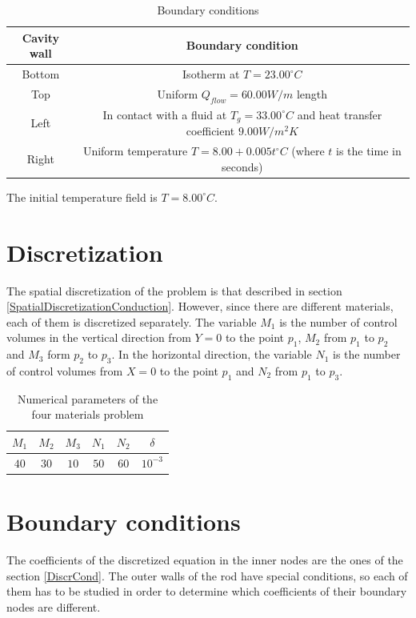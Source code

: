 \begin{table}
	\centering
	\begin{tabular}{ |c|c|}
		\hline
		Cavity wall & Boundary condition \\ \hline
		Bottom & Isotherm at $T=23.00 ^{\circ}C$ \\ \hline
		Top & Uniform $Q_{flow}=60.00 W/m$ length \\ \hline
		Left & In contact with a fluid at $T_{g}=33.00 ^{\circ}C$ and heat transfer coefficient $9.00 W/m^{2}K$ \\ \hline
		Right & Uniform temperature $T=8.00+0.005t ^{\circ}C$ (where $t$ is the time in seconds) \\ \hline
	\end{tabular}
\caption{Boundary conditions}
\end{table}

The initial temperature field is $T=8.00 ^{\circ}C$.

\section{Discretization}
The spatial discretization of the problem is that described in section \ref{SpatialDiscretizationConduction}. However, since there are different materials, each of them is discretized separately. The variable $M_{1}$ is the number of control volumes in the vertical direction from $Y=0$ to the point $p_{1}$, $M_{2}$ from $p_{1}$ to $p_{2}$ and $M_{3}$ form $p_{2}$ to $p_{3}$. In the horizontal direction, the variable $N_{1}$ is the number of control volumes from $X=0$ to the point $p_{1}$ and $N_{2}$ from $p_{1}$ to $p_{3}$.
\begin{table}[h]
	\centering
	\begin{tabular}{ |c|c|c|c|c|c| }
		\hline
		$M_{1}$ & $M_{2}$ & $M_{3}$ & $N_{1}$ & $N_{2}$ & $\delta$ \\ \hline
		$40$ & $30$ & $10$ & $50$ & $60$ & $10^{-3}$ \\ \hline
	\end{tabular}
	\caption{Numerical parameters of the four materials problem}
\end{table}

\section{Boundary conditions}
The coefficients of the discretized equation in the inner nodes are the ones of the section \ref{DiscrCond}. The outer walls of the rod have special conditions, so each of them has to be studied in order to determine which coefficients of their boundary nodes are different.

